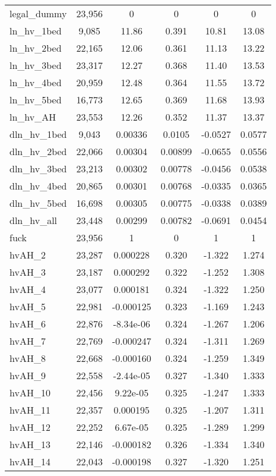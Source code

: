 \begin{tabular}{lccccc}
legal\_dummy & 23,956 & 0 & 0 & 0 & 0 \\
ln\_hv\_1bed & 9,085 & 11.86 & 0.391 & 10.81 & 13.08 \\
ln\_hv\_2bed & 22,165 & 12.06 & 0.361 & 11.13 & 13.22 \\
ln\_hv\_3bed & 23,317 & 12.27 & 0.368 & 11.40 & 13.53 \\
ln\_hv\_4bed & 20,959 & 12.48 & 0.364 & 11.55 & 13.72 \\
ln\_hv\_5bed & 16,773 & 12.65 & 0.369 & 11.68 & 13.93 \\
ln\_hv\_AH & 23,553 & 12.26 & 0.352 & 11.37 & 13.37 \\
dln\_hv\_1bed & 9,043 & 0.00336 & 0.0105 & -0.0527 & 0.0577 \\
dln\_hv\_2bed & 22,066 & 0.00304 & 0.00899 & -0.0655 & 0.0556 \\
dln\_hv\_3bed & 23,213 & 0.00302 & 0.00778 & -0.0456 & 0.0538 \\
dln\_hv\_4bed & 20,865 & 0.00301 & 0.00768 & -0.0335 & 0.0365 \\
dln\_hv\_5bed & 16,698 & 0.00305 & 0.00775 & -0.0338 & 0.0389 \\
dln\_hv\_all & 23,448 & 0.00299 & 0.00782 & -0.0691 & 0.0454 \\
fuck & 23,956 & 1 & 0 & 1 & 1 \\
hvAH\_2 & 23,287 & 0.000228 & 0.320 & -1.322 & 1.274 \\
hvAH\_3 & 23,187 & 0.000292 & 0.322 & -1.252 & 1.308 \\
hvAH\_4 & 23,077 & 0.000181 & 0.324 & -1.322 & 1.250 \\
hvAH\_5 & 22,981 & -0.000125 & 0.323 & -1.169 & 1.243 \\
hvAH\_6 & 22,876 & -8.34e-06 & 0.324 & -1.267 & 1.206 \\
hvAH\_7 & 22,769 & -0.000247 & 0.324 & -1.311 & 1.269 \\
hvAH\_8 & 22,668 & -0.000160 & 0.324 & -1.259 & 1.349 \\
hvAH\_9 & 22,558 & -2.44e-05 & 0.327 & -1.340 & 1.333 \\
hvAH\_10 & 22,456 & 9.22e-05 & 0.325 & -1.247 & 1.333 \\
hvAH\_11 & 22,357 & 0.000195 & 0.325 & -1.207 & 1.311 \\
hvAH\_12 & 22,252 & 6.67e-05 & 0.325 & -1.289 & 1.299 \\
hvAH\_13 & 22,146 & -0.000182 & 0.326 & -1.334 & 1.340 \\
hvAH\_14 & 22,043 & -0.000198 & 0.327 & -1.320 & 1.251 \\

\end{tabular}
